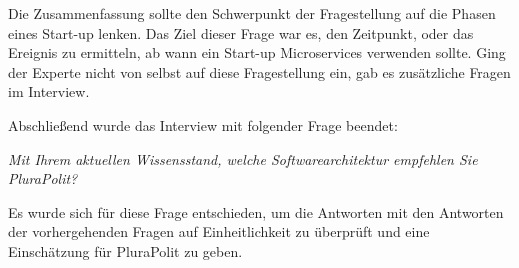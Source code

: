 Die Zusammenfassung sollte den Schwerpunkt der Fragestellung auf die Phasen eines Start-up lenken. Das Ziel dieser Frage war es, den Zeitpunkt, oder das Ereignis zu ermitteln, ab wann ein Start-up Microservices verwenden sollte. Ging der Experte nicht von selbst auf diese Fragestellung ein, gab es zusätzliche Fragen im Interview.

Abschließend wurde das Interview mit folgender Frage beendet:

\textit{Mit Ihrem aktuellen Wissensstand, welche Softwarearchitektur empfehlen Sie PluraPolit?}

Es wurde sich für diese Frage entschieden, um die Antworten mit den Antworten der vorhergehenden Fragen auf Einheitlichkeit zu überprüft und eine Einschätzung für PluraPolit zu geben.
